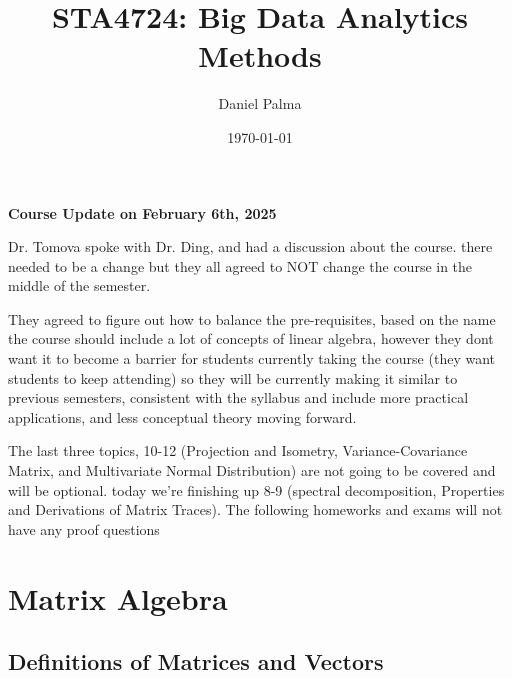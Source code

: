 \documentclass{article}
\author{Daniel Palma}
\date{\today}
\title{STA4724: Big Data Analytics Methods}
\newtheorem{theorem}{Theorem}
\theoremstyle{definition}
\theoremstyle{remark}
\begin{document}
\maketitle
\newpage

\vspace*{\fill}

\begin{center}
    \textbf{Course Update on February 6th, 2025}
\end{center}

Dr. Tomova spoke with Dr. Ding, and had a discussion about the course. there needed to be a change but they all agreed to NOT change the course in the middle of the semester.

They agreed to figure out how to balance the pre-requisites, based on the name the course should include a lot of concepts of linear algebra, however they dont want it to become a barrier for students currently taking the course (they want students to keep attending) so they will be currently making it similar to previous semesters, consistent with the syllabus and include more practical applications, and less conceptual theory moving forward.

The last three topics, 10-12 (Projection and Isometry, Variance-Covariance Matrix, and Multivariate Normal Distribution) are not going to be covered and will be optional. today we're finishing up 8-9 (spectral decomposition, Properties and Derivations of Matrix Traces). The following homeworks and exams will not have any proof questions

\vspace*{\fill}

\newpage

\tableofcontents
\newpage

\section{Matrix Algebra}

\subsection{Definitions of Matrices and Vectors}
\end{document}

